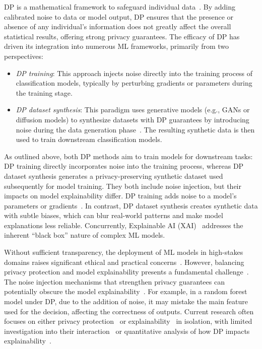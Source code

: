 \documentclass{article}
\begin{document}
DP is a mathematical framework to safeguard individual data~\cite{dwork2008differential}. By adding calibrated noise to data or model output, DP ensures that the presence or absence of any individual's information does not greatly affect the overall statistical results, offering strong privacy guarantees. The efficacy of DP has driven its integration into numerous ML frameworks, primarily from two perspectives:

\begin{itemize}[leftmargin=*]
    \item \textit{DP training}: This approach injects noise directly into the training process of classification models, typically by perturbing gradients or parameters during the training stage.
    \item \textit{DP dataset synthesis}: This paradigm uses generative models (e.g., GANs or diffusion models) to synthesize datasets with DP guarantees by introducing noise during the data generation phase~\cite{ghalebikesabi2023differentially,lin2023differentially,li2023meticulously,gong2025dpimagebench}. The resulting synthetic data is then used to train downstream classification models.
\end{itemize}

As outlined above, both DP methods aim to train models for downstream tasks: DP training directly incorporates noise into the training process, whereas DP dataset synthesis generates a privacy-preserving synthetic dataset used subsequently for model training. They both include noise injection, but their impacts on model explainability differ. DP training adds noise to a model’s parameters or gradients~\cite{abadi2016deep}. In contrast, DP dataset synthesis creates synthetic data with subtle biases, which can blur real-world patterns and make model explanations less reliable. Concurrently, Explainable AI (XAI)~\cite{ortigossa2024explainable} addresses the inherent ``black box'' nature of complex ML models.
 
Without sufficient transparency, the deployment of ML models in high-stakes domains raises significant ethical and practical concerns~\cite{zytek2021sibyl}. However, balancing privacy protection and model explainability presents a fundamental challenge~\cite{williamson2024balancing}. The noise injection mechanisms that strengthen privacy guarantees can potentially obscure the model explainability~\cite{shokri2021privacy}. For example, in a random forest model under DP, due to the addition of noise, it may mistake the main feature used for the decision, affecting the correctness of outputs. Current research often focuses on either privacy protection~\cite{wei2023dpmlbench} or explainability~\cite{ortigossa2024explainable} in isolation, with limited investigation into their interaction~\cite{naidu2021differential} or quantitative analysis of how DP impacts explainability~\cite{nguyen2025privacy}.
\end{document}
